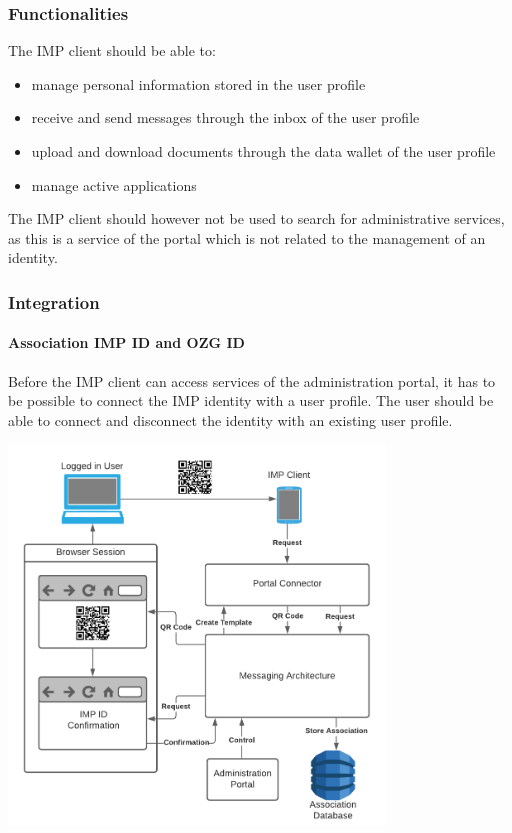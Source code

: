 \documentclass[
     12pt,         %
     a4paper,      %
     BCOR=10mm,version=first,     %
     DIV=14,version=first,        %
     ]{scrreprt}
\begin{document}
\subsubsection{Functionalities}

The IMP client should be able to:
\begin{itemize}
    \item manage personal information stored in the user profile
    \item receive and send messages through the inbox of the user profile
    \item upload and download documents through the data wallet of the user profile
    \item manage active applications
\end{itemize}

The IMP client should however not be used to search for administrative services, as this is a service of the portal which is not related to the management of an identity.

\subsubsection{Integration}

\paragraph{Association IMP ID and OZG ID}

Before the IMP client can access services of the administration portal, it has to be possible to connect the IMP identity with a user profile. The user should be able to connect and disconnect the identity with an existing user profile.

\begin{center}
    \includegraphics[width=10cm]{Diagrams/Integration 1/Connection/Overview.png}
\end{center}
\end{document}
